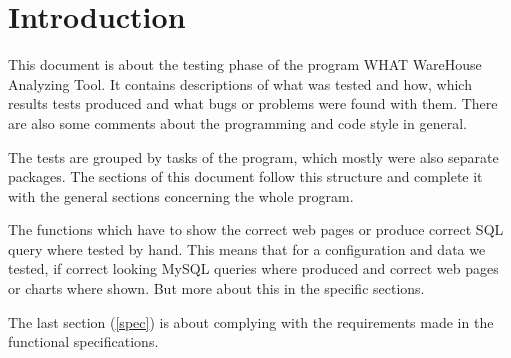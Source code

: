 \section{Introduction}

This document is about the testing phase of the program WHAT WareHouse Analyzing Tool.
It contains descriptions of what was tested and how, which results tests produced and 
what bugs or problems were found with them.
There are also some comments about the programming and code style in general. 

The tests are grouped by tasks of the program, which mostly were also separate packages. 
The sections of this document follow this structure and complete it with the general sections concerning the whole program.

The functions which have to show the correct web pages or produce correct SQL query where tested by hand. 
This means that for a configuration and data we tested, 
if correct looking MySQL queries where produced and correct web pages or charts where shown. 
But more about this in the specific sections.


The last section (\ref{spec}) is about complying with the requirements made in the functional specifications.




 